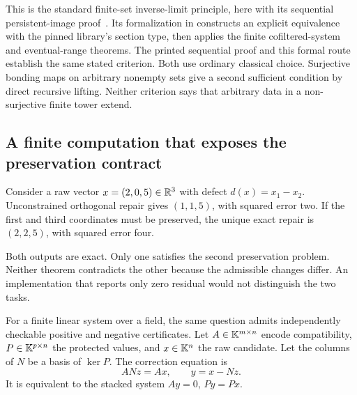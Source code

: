 This is the standard finite-set inverse-limit principle, here with its sequential persistent-image proof~\cite{stacks-limits}. Its formalization in  constructs an explicit equivalence with the pinned library's section type, then applies the finite cofiltered-system and eventual-range theorems. The printed sequential proof and this formal route establish the same stated criterion. Both use ordinary classical choice. Surjective bonding maps on arbitrary nonempty sets give a second sufficient condition by direct recursive lifting. Neither criterion says that arbitrary data in a non-surjective finite tower extend.

\subsection{A finite computation that exposes the preservation contract}
Consider a raw vector \(x=(2,0,5)\in\mathbb R^3\) with defect \(d(x)=x_1-x_2\). Unconstrained orthogonal repair gives \((1,1,5)\), with squared error two. If the first and third coordinates must be preserved, the unique exact repair is \((2,2,5)\), with squared error four.

Both outputs are exact. Only one satisfies the second preservation problem. Neither theorem contradicts the other because the admissible changes differ. An implementation that reports only zero residual would not distinguish the two tasks.

For a finite linear system over a field, the same question admits independently checkable positive and negative certificates. Let \(A\in\mathbb K^{m\times n}\) encode compatibility, \(P\in\mathbb K^{p\times n}\) the protected values, and \(x\in\mathbb K^n\) the raw candidate. Let the columns of \(N\) be a basis of \(\ker P\). The correction equation is
\[
 ANz=Ax,\qquad y=x-Nz.
\]
It is equivalent to the stacked system \(Ay=0\), \(Py=Px\).

